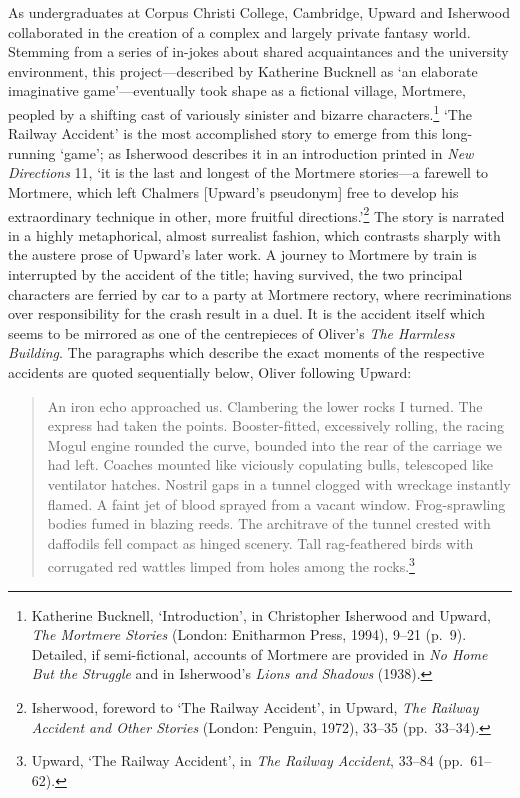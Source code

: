 \documentclass[]{article}
\begin{document}
As undergraduates at Corpus Christi College, Cambridge, Upward and
Isherwood collaborated in the creation of a complex and largely private
fantasy world. Stemming from a series of in-jokes about shared
acquaintances and the university environment, this project---described
by Katherine Bucknell as `an elaborate imaginative game'---eventually
took shape as a fictional village, Mortmere, peopled by a shifting cast
of variously sinister and bizarre characters.\footnote{Katherine
  Bucknell, `Introduction', in Christopher Isherwood and Upward,
  \emph{The Mortmere Stories} (London: Enitharmon Press, 1994), 9--21
  (p.~9). Detailed, if semi-fictional, accounts of Mortmere are provided
  in \emph{No Home But the Struggle} and in Isherwood's \emph{Lions and
  Shadows} (1938).} `The Railway Accident' is the most accomplished
story to emerge from this long-running `game'; as Isherwood describes it
in an introduction printed in \emph{New Directions} 11, `it is the last
and longest of the Mortmere stories---a farewell to Mortmere, which left
Chalmers {[}Upward's pseudonym{]} free to develop his extraordinary
technique in other, more fruitful directions.'\footnote{Isherwood,
  foreword to `The Railway Accident', in Upward, \emph{The Railway
  Accident and Other Stories} (London: Penguin, 1972), 33--35
  (pp.~33--34).} The story is narrated in a highly metaphorical, almost
surrealist fashion, which contrasts sharply with the austere prose of
Upward's later work. A journey to Mortmere by train is interrupted by
the accident of the title; having survived, the two principal characters
are ferried by car to a party at Mortmere rectory, where recriminations
over responsibility for the crash result in a duel. It is the accident
itself which seems to be mirrored as one of the centrepieces of Oliver's
\emph{The Harmless Building}. The paragraphs which describe the exact
moments of the respective accidents are quoted sequentially below,
Oliver following Upward:

\begin{quote}
An iron echo approached us. Clambering the lower rocks I turned. The
express had taken the points. Booster-fitted, excessively rolling, the
racing Mogul engine rounded the curve, bounded into the rear of the
carriage we had left. Coaches mounted like viciously copulating bulls,
telescoped like ventilator hatches. Nostril gaps in a tunnel clogged
with wreckage instantly flamed. A faint jet of blood sprayed from a
vacant window. Frog-sprawling bodies fumed in blazing reeds. The
architrave of the tunnel crested with daffodils fell compact as hinged
scenery. Tall rag-feathered birds with corrugated red wattles limped
from holes among the rocks.\footnote{Upward, `The Railway Accident', in
  \emph{The Railway Accident}, 33--84 (pp.~61--62).}
\end{quote}
\end{document}
